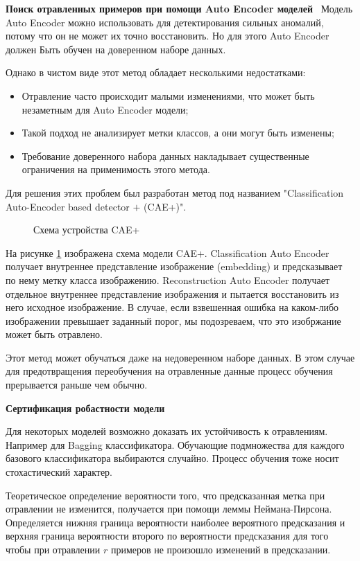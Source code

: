\textbf{Поиск отравленных примеров при помощи Auto Encoder моделей}~\cite{razmi_classification_2021}
Модель Auto Encoder можно использовать для детектирования сильных аномалий, потому что он не может их точно восстановить. Но для этого Auto Encoder должен Быть обучен на доверенном наборе данных.

Однако в чистом виде этот метод обладает несколькими недостатками:
\begin{itemize}
    \item Отравление часто происходит малыми изменениями, что может быть незаметным для Auto Encoder модели;
    \item Такой подход не анализирует метки классов, а они могут быть изменены;
    \item Требование доверенного набора данных накладывает существенные ограничения на применимость этого метода.
\end{itemize}
Для решения этих проблем был разработан метод под названием "Classification Auto-Encoder based detector $+$ (CAE+)".

\begin{figure}[h]
    \caption{Схема устройства CAE+}
    \label{cae_plus_image}
\end{figure}

На рисунке \ref{cae_plus_image} изображена схема модели CAE+. Classification Auto Encoder получает внутреннее представление изображение (embedding) и предсказывает по нему метку класса изображению. Reconstruction Auto Encoder получает отдельное внутреннее представление изображения и пытается восстановить из него исходное изображение. В случае, если взвешенная ошибка на каком-либо изображении превышает заданный порог, мы подозреваем, что это изобржание может быть отравлено.

Этот метод может обучаться даже на недоверенном наборе данных. В этом случае для предотвращения переобучения на отравленные данные процесс обучения прерывается раньше чем обычно.


\textbf{Сертификация робастности модели}~\cite{jia_intrinsic_2020}

Для некоторых моделей возможно доказать их устойчивость к отравлениям. Например для Bagging классификатора.
Обучающие подмножества для каждого базового классификатора выбираются случайно. Процесс обучения тоже носит стохастический характер.

Теоретическое определение вероятности того, что предсказанная метка при отравлении не изменится, получается при помощи леммы Неймана-Пирсона.
Определяется нижняя граница вероятности наиболее вероятного
предсказания и верхняя граница вероятности второго по вероятности предсказания для того чтобы при отравлении $r$ примеров не произошло изменений в предсказании.

